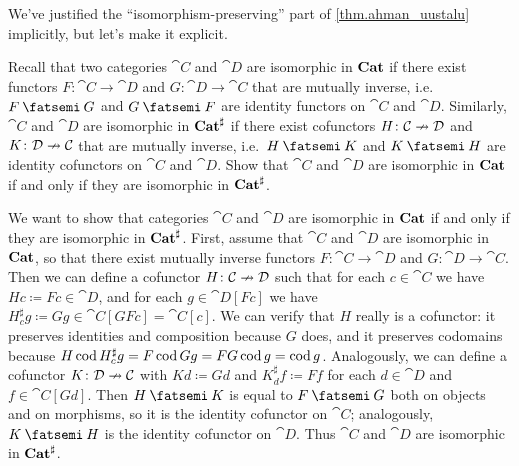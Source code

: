 \documentclass[Book-Poly]{subfiles}
\begin{document}
\begin{exercise}
We've justified the ``isomorphism-preserving'' part of \cref{thm.ahman_uustalu} implicitly, but let's make it explicit.

Recall that two categories $\cat{C}$ and $\cat{D}$ are isomorphic in $\mathbf{Cat}$ if there exist functors $F\colon\cat{C}\to\cat{D}$ and $G\colon\cat{D}\to\cat{C}$ that are mutually inverse, i.e.\ $F\then G$ and $G\then F$ are identity functors on $\cat{C}$ and $\cat{D}$.
Similarly, $\cat{C}$ and $\cat{D}$ are isomorphic in $\mathbf{Cat}^\sharp$ if there exist cofunctors $H\colon\mathcal{C}\nrightarrow\mathcal{D}$ and $K\colon\mathcal{D}\nrightarrow\mathcal{C}$ that are mutually inverse, i.e.\ $H\then K$ and $K\then H$ are identity cofunctors on $\cat{C}$ and $\cat{D}$.
Show that $\cat{C}$ and $\cat{D}$ are isomorphic in $\mathbf{Cat}$ if and only if they are isomorphic in $\mathbf{Cat}^\sharp$.
\begin{solution}
We want to show that categories $\cat{C}$ and $\cat{D}$ are isomorphic in $\mathbf{Cat}$ if and only if they are isomorphic in $\mathbf{Cat}^\sharp$.
First, assume that $\cat{C}$ and $\cat{D}$ are isomorphic in $\mathbf{Cat}$, so that there exist mutually inverse functors $F\colon\cat{C}\to\cat{D}$ and $G\colon\cat{D}\to\cat{C}$.
Then we can define a cofunctor $H\colon\mathcal{C}\nrightarrow\mathcal{D}$ such that for each $c\in\cat{C}$ we have $Hc\coloneqq Fc\in\cat{D}$, and for each $g\in\cat{D}[Fc]$ we have $H^\sharp_c g\coloneqq Gg\in\cat{C}[GFc]=\cat{C}[c]$.
We can verify that $H$ really is a cofunctor: it preserves identities and composition because $G$ does, and it preserves codomains because $H\operatorname{cod} H^\sharp_c g=F\operatorname{cod} Gg=FG\operatorname{cod} g=\operatorname{cod} g$.
Analogously, we can define a cofunctor $K\colon\mathcal{D}\nrightarrow\mathcal{C}$ with $Kd\coloneqq Gd$ and $K^\sharp_d f\coloneqq Ff$ for each $d\in\cat{D}$ and $f\in\cat{C}[Gd]$.
Then $H\then K$ is equal to $F\then G$ both on objects and on morphisms, so it is the identity cofunctor on $\cat{C}$; analogously, $K\then H$ is the identity cofunctor on $\cat{D}$.
Thus $\cat{C}$ and $\cat{D}$ are isomorphic in $\mathbf{Cat}^\sharp$.


\end{solution}
\end{exercise}
\end{document}

